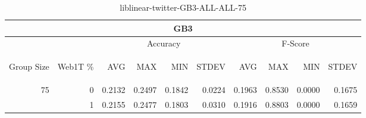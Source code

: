 \begin{center}
\begin{table}[htbp] 
 \begin{center}
\begin{tabular}{ | r | r | r | r | r | r | r | r | r | r |}
\hline
\multicolumn{10}{|c|}{GB3}\\
\hline
 & & \multicolumn{4}{|c|}{Accuracy} & \multicolumn{4}{|c|}{F-Score}\\ \cline{3-10}
\begin{sideways}Group Size\end{sideways} & \begin{sideways}Web1T \%\end{sideways} & \begin{sideways}AVG\end{sideways} & \begin{sideways}MAX\end{sideways} & \begin{sideways}MIN\end{sideways} & \begin{sideways}STDEV\end{sideways} & \begin{sideways}AVG\end{sideways} & \begin{sideways}MAX\end{sideways} & \begin{sideways}MIN\end{sideways} & \begin{sideways}STDEV\end{sideways}\\
\hline
\multirow{1}{*}{75}
 & 0 & 0.2132 & 0.2497 & 0.1842 & 0.0224 & 0.1963 & 0.8530 & 0.0000 & 0.1675\\ \cline{2-10}
 & 1 & 0.2155 & 0.2477 & 0.1803 & 0.0310 & 0.1916 & 0.8803 & 0.0000 & 0.1659\\ \cline{2-10}
\hline
\end{tabular}
\caption{liblinear-twitter-GB3-ALL-ALL-75}
\label{table:liblinear-twitter-GB3-ALL-ALL-75}
\end{center}
 \end{table}
\end{center}

